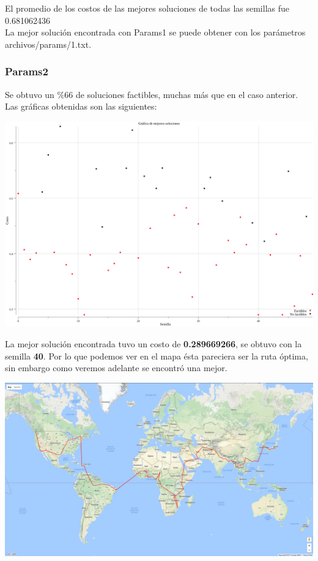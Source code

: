 \documentclass[12pt]{article}
\begin{document}
El promedio de los costos de las mejores soluciones de todas las semillas fue 0.681062436 \\

La mejor solución encontrada con Params1 se puede obtener con los parámetros \textsf{archivos/params/1.txt}.

\newpage

\subsubsection*{Params2}

Se obtuvo un $\%$66 de soluciones factibles, muchas más que en el caso anterior. \\
Las gráficas obtenidas son las siguientes: 

\begin{center}
  \includegraphics[scale=0.25]{../archivos/graficas/mejores-soluciones/soluciones2.png} \\
\end{center}
  
La mejor solución encontrada tuvo un costo de \textbf{0.289669266}, se obtuvo con la semilla \textbf{40}. Por lo que podemos ver en el mapa ésta pareciera ser la ruta óptima, sin embargo como veremos adelante se encontró una mejor.  \\

\begin{center}
  \includegraphics[scale=0.2]{../archivos/mapas/mapa2.png} \\
\end{center}
\end{document}

